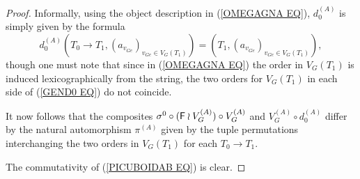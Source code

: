 \documentclass[a4paper,10pt]{article}%
\begin{document}
\begin{proof}
Informally, using the object description in (\ref{OMEGAGNA EQ}),
$d_0^{(A)}$ is simply given by the formula
\begin{equation}\label{GEND0 EQ}
d_0^{(A)} \left(
T_0 \to T_1,
(a_{v_{G e}})_{v_{G e}\in V_G(T_1)}
\right)
=
\left(
T_1,
(a_{v_{G e}})_{v_{G e} \in V_G(T_1)}
\right),
\end{equation}
though one must note that since in (\ref{OMEGAGNA EQ}) the
order in $V_G(T_1)$ is induced lexicographically from the string, the two orders for $V_G(T_1)$ in each side of (\ref{GEND0 EQ})
do not coincide.

It now follows that the composites 
$\sigma^0 \circ (\mathsf{F} \wr V_G^{(A)}) \circ V_G^{(A)}$
and 
$V_G^{(A)} \circ d_0^{(A)}$
differ by the natural automorphism $\pi^{(A)}$
given by the tuple permutations interchanging the two orders in
$V_G(T_1)$ for each $T_0 \to T_1$.

The commutativity of (\ref{PICUBOIDAB EQ}) is clear.
\end{proof}
\end{document}
